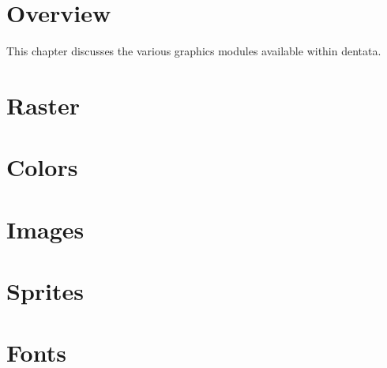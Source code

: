 %
% 
% 
\def\FileCreated{Thu Jun 21 02:19:53 2001}
\def\FileRevised{Sun Jun 24 19:38:04 2001}

\section{Overview}

This chapter discusses the various graphics modules available within
dentata.

\section{Raster}
\label{sec:graphraster}

\section{Colors}
\label{sec:graphcolors}

\section{Images}
\label{sec:graphimages}

\section{Sprites}
\label{sec:graphsprites}

\section{Fonts}
\label{sec:graphfonts}
